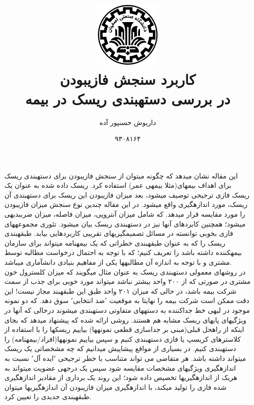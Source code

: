 \documentclass[10pt,a4paper]{article}
\newcommand{\نیمفاصله}{\halfspace}
\renewcommand{\ }{\halfspace}
\begin{document}
\title{
    \includegraphics[width=0.25\textwidth]{iut}\\\vspace{30pt}
    کاربرد سنجش فازی\ بودن\\در بررسی دسته\ بندی ریسک در بیمه    
}
\author{داریوش حسن\ پور آده}
\date{۹۳۰۸۱۶۴}
\maketitle
\null
\vfill
\thispagestyle{empty}
\setcounter{page}{0}
\newpage
این مقاله\
\cite{THEPAPER}
نشان می\ دهد که چگونه می\ توان از سنجش فازی\ بودن برای دسته\ بندی ریسک برای اهداف بیمه\ ای(مثلا بیمه\ ی عمر) استفاده کرد. ریسک داده شده به عنوان یک ریسک فازی ترجیحی توصیف می\ شود، بعد میزان فازی\ بودن این ریسک برای دستهی آن ریسک، مورد اندازه\ گیری واقع می\ شود.
در این مقاله چندین نوع سنجش میزان فازی\ بودن را مورد مقایسه قرار می\ دهد. که شامل میزان آنتروپی، میزان فاصله، میزان ضرب\ بدیهی\زیرنویس{\lr{Axiomatic Product}} می\ شود؛ همچنین کابردهای آنها نیز در دسته\ بندی ریسک بیان می\ شود.\بند
تئوری مجموعه\ های فازی بخوبی توانسته در مسائل تصمیم\ گیری\ های تقریبی کاربردهایی بیابد. طبقه\ بندی ریسک را که به عنوان طبقه\ بندی خطراتی که یک بیمه\ نامه می\ تواند برای سازمان بیمه\ کننده داشته باشد را تعریف کنیم؛ که با توجه به احتمال درخواست مطالبه توسط مشتری و با توجه به اندازه آن مطالبه\ ها یکی از مفاهیم بنیادی دانش\ آماری می\ باشد.\\
در روش\ های معمولی دسته\ بندی ریسک به عنوان مثال می\ گویند که میزان کلسترول خون مشتری در صورتی که از ۲۰۰ واحد بیشتر نباشد می\ تواند مورد خوبی برای جذب از سمت شرکت بیمه باشد، در حالی که میزان ۲۰۱ واحد طبق این طبقه\ بند مجاز نیست! این دقت ممکن است شرکت بیمه را نهایتا به موقعیت ٬ضد انتخابی\زیرنویس{\lr{Anti-Selection}}٬ سوق دهد. که دو نمونه موجود در لبه\ ی خط جداکننده به دسته\ های متفاوتی دستهی می\ شوند درحالی که آنها در ویژگی\ های پایه\ ای ریسک مشابه هم هستند. روشی ارائه شده که پیشنهاد می\ دهد که بجای اینکه از راه\ حل قبلی(مبنی بر جداسازی قطعی نمونه\ ها) بیاییم ریسک\ ها را با استفاده از کلاسترهای کریسپ یا فازی دستهی کنیم و سپس بیاییم نمونه\ ها(افراد/بیمه\ نامه) را دسته\ بندی کنیم.\بند
در بسیاری از مواقع پیشاپیش می\ دانیم که چه مشخصاتی یک ریسک می\ تواند داشته باشد. هر متقاضی می تواند متناسب با خطر ترجیحی ٬ایده آل٬ نسبت به اندازه\ گیری ویژگی\ های مشخصات مقایسه شود سپس یک درجه\ ی عضویت می\ تواند به هریک از اندازه\ گیری\ ها تخصیص داده شود؛ این روند یک برداری از مقادیر اندازه\ گیری شده فازی را تولید می\ کند، با اندازه\ گیری میزان فازی\ بودن آن اندازه\ گیری\ ها می\ توان طبقه\ بندی جدیدی را تعیین کرد.\بند
\end{document}
